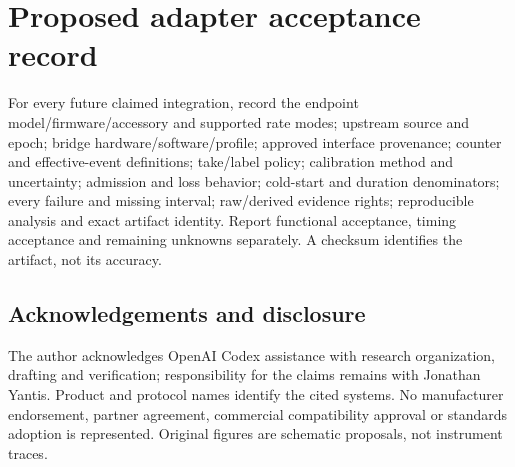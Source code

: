 \documentclass[11pt,letterpaper]{article}
\begin{document}
\section{Proposed adapter acceptance record}
For every future claimed integration, record the endpoint model/firmware/accessory and supported rate modes; upstream source and epoch; bridge hardware/software/profile; approved interface provenance; counter and effective-event definitions; take/label policy; calibration method and uncertainty; admission and loss behavior; cold-start and duration denominators; every failure and missing interval; raw/derived evidence rights; reproducible analysis and exact artifact identity. Report functional acceptance, timing acceptance and remaining unknowns separately. A checksum identifies the artifact, not its accuracy.

\clearpage
\begin{samepage}
\section*{Acknowledgements and disclosure}
The author acknowledges OpenAI Codex assistance with research organization, drafting and verification; responsibility for the claims remains with Jonathan Yantis. Product and protocol names identify the cited systems. No manufacturer endorsement, partner agreement, commercial compatibility approval or standards adoption is represented. Original figures are schematic proposals, not instrument traces.

\end{samepage}
\end{document}
